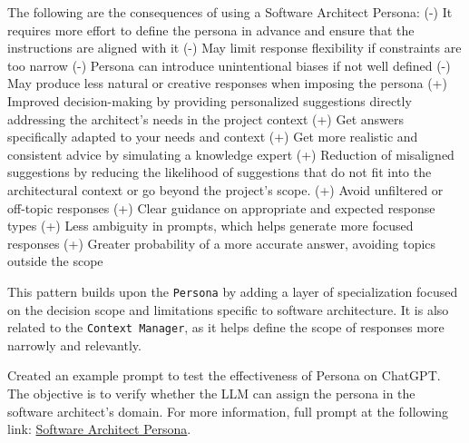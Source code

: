  The following are the consequences of using a Software Architect Persona: 
\newline
\textcolor{mycolorred}{(-)} It requires more effort to define the persona in advance and ensure that the instructions are aligned with it \newline
\textcolor{mycolorred}{(-)} May limit response flexibility if constraints are too narrow\newline
\textcolor{mycolorred}{(-)} Persona can introduce unintentional biases if not well defined\newline
\textcolor{mycolorred}{(-)} May produce less natural or creative responses when imposing the persona\newline
\textcolor{mycolorblue}{(+)} Improved decision-making by providing personalized suggestions directly addressing the architect's needs in the project context\newline
\textcolor{mycolorblue}{(+)} Get answers specifically adapted to your needs and context\newline
\textcolor{mycolorblue}{(+)} Get more realistic and consistent advice by simulating a knowledge expert\newline
\textcolor{mycolorblue}{(+)} Reduction of misaligned suggestions by reducing the likelihood of suggestions that do not fit into the architectural context or go beyond the project's scope.\newline
\textcolor{mycolorblue}{(+)} Avoid unfiltered or off-topic responses\newline
\textcolor{mycolorblue}{(+)} Clear guidance on appropriate and expected response types\newline
\textcolor{mycolorblue}{(+)} Less ambiguity in prompts, which helps generate more focused responses\newline
\textcolor{mycolorblue}{(+)} Greater probability of a more accurate answer, avoiding topics outside the scope

 This pattern builds upon the \texttt{Persona} by adding a layer of specialization focused on the decision scope and limitations specific to software architecture. It is also related to the \texttt{Context Manager}, as it helps define the scope of responses more narrowly and relevantly.

 Created an example prompt to test the effectiveness of Persona on ChatGPT. The objective is to verify whether the LLM can assign the persona in the software architect's domain. For more information, full prompt at the following link: \href{https://chat.openai.com/share/ee2385fe-0040-4468-9db7-72d8e6bd2864}{Software Architect Persona}.

